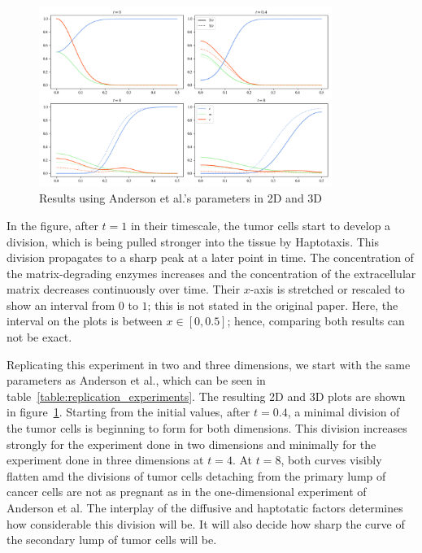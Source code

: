 \begin{figure}[ht!]
    \centering
    \includegraphics[width=0.85\textwidth]{resources/images/1D_replication_3D.png}
    \caption{Results using Anderson et al.'s parameters in 2D and 3D}
    \label{fig:unadjsuted_replication}
\end{figure}

In the figure, after $t=1$ in their timescale, the tumor cells start to develop a division, which is being pulled stronger into the tissue by Haptotaxis. This division propagates to a sharp peak at a later point in time. The concentration of the matrix-degrading enzymes increases and the concentration of the extracellular matrix decreases continuously over time. Their $x$-axis is stretched or rescaled to show an interval from $0$ to $1$; this is not stated in the original paper. Here, the interval on the plots is between $x\in[0,0.5]$; hence, comparing both results can not be exact.

Replicating this experiment in two and three dimensions, we start with the same parameters as Anderson et al., which can be seen in table~\ref{table:replication_experiments}. The resulting 2D and 3D plots are shown in figure~\ref{fig:unadjsuted_replication}. Starting from the initial values, after $t=0.4$, a minimal division of the tumor cells is beginning to form for both dimensions. This division increases strongly for the experiment done in two dimensions and minimally for the experiment done in three dimensions at $t=4$. At $t=8$, both curves visibly flatten amd the divisions of tumor cells detaching from the primary lump of cancer cells are not as pregnant as in the one-dimensional experiment of Anderson et al. The interplay of the diffusive and haptotatic factors determines how considerable this division will be. It will also decide how sharp the curve of the secondary lump of tumor cells will be.

